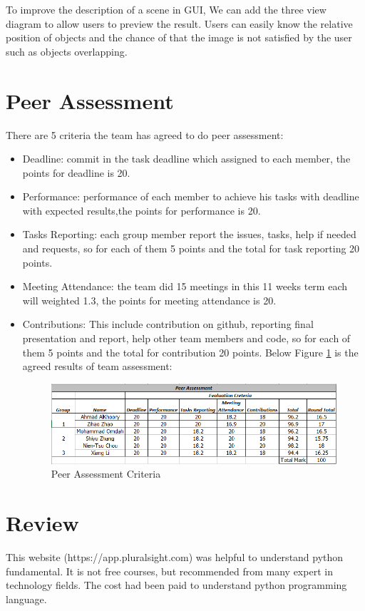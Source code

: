\documentclass[a4paper, 12pt]{article}
\begin{document}
To improve the description of a scene in GUI, We can add the three view diagram to allow users to preview the result. Users can easily know the relative position of objects and the chance of that the image is not satisfied by the user such as objects overlapping.  

\section{Peer Assessment}
There are 5 criteria the team has agreed to do peer assessment:
\begin{itemize}
\item Deadline: commit in the task deadline which assigned to each member, the points for deadline is 20.
\item Performance: performance of each member to achieve his tasks with deadline with expected results,the points for performance is 20. 
\item Tasks Reporting: each group member report the issues, tasks, help if needed and requests, so for each of them 5 points and the total for task reporting 20 points.
\item Meeting Attendance:   the team did 15 meetings in this 11 weeks term each will weighted 1.3, the points for meeting attendance is 20.
\item Contributions: This include contribution on github, reporting final presentation and report, help other team members and code, so for each of them 5 points and the total for contribution 20 points. Below Figure \ref{fig:Peerass} is the agreed results of team assessment:

\begin{figure}[ht]
\includegraphics[width=\linewidth]{peer_assessment.PNG}
\caption{Peer Assessment Criteria}
\label{fig:Peerass}
\end{figure}

\end{itemize}

\section{Review}
This website (https://app.pluralsight.com) was helpful to understand python fundamental. It is not free courses, but recommended from many expert in technology fields. The cost had been paid to understand python programming language.
\end{document}
